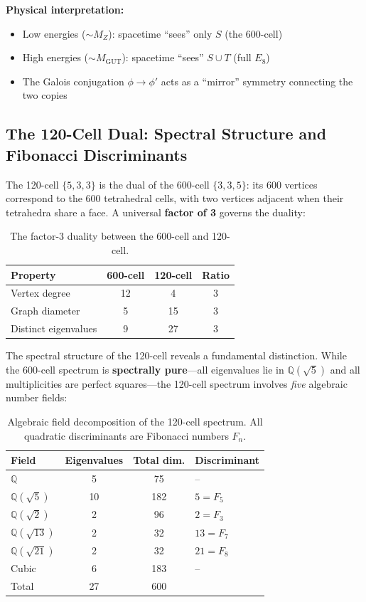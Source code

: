 \documentclass[12pt,a4paper]{article}
\begin{document}
\textbf{Physical interpretation:}
\begin{itemize}
    \item Low energies ($\sim M_Z$): spacetime ``sees'' only $S$ (the 600-cell)
    \item High energies ($\sim M_{\text{GUT}}$): spacetime ``sees'' $S \cup T$ (full $E_8$)
    \item The Galois conjugation $\phi \to \phi'$ acts as a ``mirror'' symmetry connecting the two copies
\end{itemize}

\subsection{The 120-Cell Dual: Spectral Structure and Fibonacci Discriminants}
\label{sec:120cell}

The 120-cell $\{5,3,3\}$ is the dual of the 600-cell $\{3,3,5\}$: its 600 vertices correspond to the 600 tetrahedral cells, with two vertices adjacent when their tetrahedra share a face. A universal \textbf{factor of 3} governs the duality:

\begin{table}[H]
\centering
\begin{tabular}{lccc}
\toprule
\textbf{Property} & \textbf{600-cell} & \textbf{120-cell} & \textbf{Ratio} \\
\midrule
Vertex degree & 12 & 4 & 3 \\
Graph diameter & 5 & 15 & 3 \\
Distinct eigenvalues & 9 & 27 & 3 \\
\bottomrule
\end{tabular}
\caption{The factor-3 duality between the 600-cell and 120-cell.}
\end{table}

The spectral structure of the 120-cell reveals a fundamental distinction. While the 600-cell spectrum is \textbf{spectrally pure}---all eigenvalues lie in $\mathbb{Q}(\sqrt{5})$ and all multiplicities are perfect squares---the 120-cell spectrum involves \emph{five} algebraic number fields:

\begin{table}[H]
\centering
\begin{tabular}{lccl}
\toprule
\textbf{Field} & \textbf{Eigenvalues} & \textbf{Total dim.} & \textbf{Discriminant} \\
\midrule
$\mathbb{Q}$ & 5 & 75 & -- \\
$\mathbb{Q}(\sqrt{5})$ & 10 & 182 & $5 = F_5$ \\
$\mathbb{Q}(\sqrt{2})$ & 2 & 96 & $2 = F_3$ \\
$\mathbb{Q}(\sqrt{13})$ & 2 & 32 & $13 = F_7$ \\
$\mathbb{Q}(\sqrt{21})$ & 2 & 32 & $21 = F_8$ \\
Cubic & 6 & 183 & -- \\
\midrule
Total & 27 & 600 & \\
\bottomrule
\end{tabular}
\caption{Algebraic field decomposition of the 120-cell spectrum. All quadratic discriminants are Fibonacci numbers $F_n$.}
\label{tab:120cell_spectrum}
\end{table}
\end{document}
